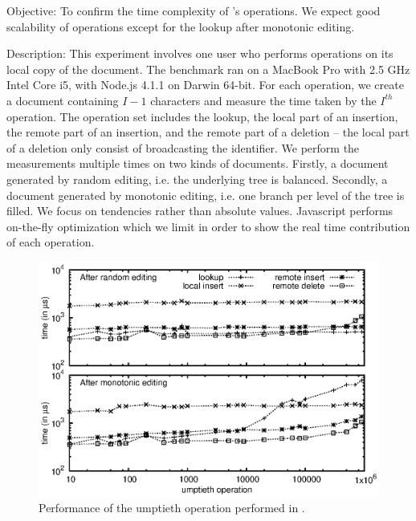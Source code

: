 \begin{asparadesc}
\item [Objective:] To confirm the time complexity of \LSEQ's operations. We
  expect good scalability of operations except for the lookup after monotonic
  editing.
\item [Description:] This experiment involves one user who performs operations
  on its local copy of the document. The benchmark ran on a MacBook Pro with 2.5
  GHz Intel Core i5, with Node.js 4.1.1 on Darwin 64-bit. For each operation, we
  create a document containing $I-1$ characters and measure the time taken by
  the $I^{th}$ operation. The operation set includes the lookup, the local part
  of an insertion, the remote part of an insertion, and the remote part of a
  deletion -- the local part of a deletion only consist of broadcasting the
  identifier. We perform the measurements multiple times on two kinds of
  documents. Firstly, a document generated by random editing, i.e. the
  underlying \LSEQ tree is balanced. Secondly, a document generated by monotonic
  editing, i.e. one branch per level of the \LSEQ tree is filled.  We focus on
  tendencies rather than absolute values. Javascript performs on-the-fly
  optimization which we limit in order to show the real time contribution of
  each operation.

\begin{figure}
  \centering
  \includegraphics[width=\FIGUREWIDTH\textwidth]{./img/time.eps}
  \caption{\label{fig:time} Performance of the umptieth operation performed in
    \LSEQ.}
\end{figure}


\end{asparadesc}

